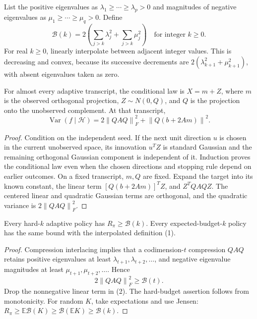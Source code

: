 \documentclass[11pt,a4paper]{article}
\newcommand{\E}{\mathbb E}\newcommand{\Var}{\operatorname{Var}}
\newcommand{\norm}[1]{\left\lVert#1\right\rVert}
\begin{document}
List the positive eigenvalues as $\lambda_1\ge\cdots\ge\lambda_p>0$ and magnitudes of negative eigenvalues as $\mu_1\ge\cdots\ge\mu_q>0$. Define
\[
 \mathcal B(k)=2\left(\sum_{j>k}\lambda_j^2+\sum_{j>k}\mu_j^2\right)
 \quad\text{for integer }k\ge0. \tag{1}
\]
For real $k\ge0$, linearly interpolate between adjacent integer values. This is decreasing and convex, because its successive decrements are $2(\lambda_{k+1}^2+\mu_{k+1}^2)$, with absent eigenvalues taken as zero.

\begin{lemma}\label{lem:conditional}
For almost every adaptive transcript, the conditional law is $X=m+Z$, where $m$ is the observed orthogonal projection, $Z\sim N(0,Q)$, and $Q$ is the projection onto the unobserved complement. At that transcript,
\[
 \Var(f\mid\mathcal H)
 =2\norm{QAQ}_F^2+\norm{Q(b+2Am)}^2. \tag{2}
\]
\end{lemma}
\begin{proof}
Condition on the independent seed. If the next unit direction $u$ is chosen in the current unobserved space, its innovation $u^TZ$ is standard Gaussian and the remaining orthogonal Gaussian component is independent of it. Induction proves the conditional law even when the chosen directions and stopping rule depend on earlier outcomes. On a fixed transcript, $m,Q$ are fixed. Expand the target into its known constant, the linear term $[Q(b+2Am)]^TZ$, and $Z^TQAQZ$. The centered linear and quadratic Gaussian terms are orthogonal, and the quadratic variance is $2\norm{QAQ}_F^2$.
\end{proof}

\begin{lemma}\label{lem:lower}
Every hard-$k$ adaptive policy has $R_\pi\ge\mathcal B(k)$. Every expected-budget-$k$ policy has the same bound with the interpolated definition (1).
\end{lemma}
\begin{proof}
Compression interlacing implies that a codimension-$t$ compression $QAQ$ retains positive eigenvalues at least $\lambda_{t+1},\lambda_{t+2},\ldots$, and negative eigenvalue magnitudes at least $\mu_{t+1},\mu_{t+2},\ldots$. Hence
\[
 2\norm{QAQ}_F^2\ge\mathcal B(t).
\]
Drop the nonnegative linear term in (2). The hard-budget assertion follows from monotonicity. For random $K$, take expectations and use Jensen:
$R_\pi\ge\E\mathcal B(K)\ge\mathcal B(\E K)\ge\mathcal B(k)$.
\end{proof}
\end{document}
